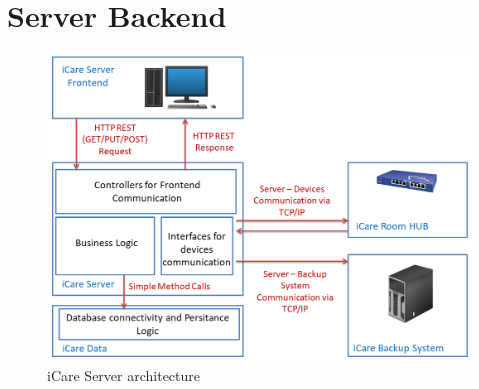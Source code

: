 \section{Server Backend}
\begin{figure}[H]
	\centering
	\includegraphics[width =1.0\textwidth]{images/server-architecture.PNG}
	\caption{iCare Server architecture}
	\label{icare-dataflow}
\end{figure}